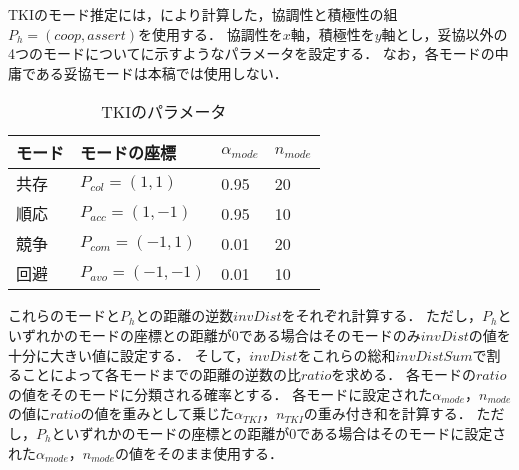 TKIのモード推定には，により計算した，協調性と積極性の組$P_h = (coop, assert)$を使用する．
協調性を$x$軸，積極性を$y$軸とし，妥協以外の4つのモードについてに示すようなパラメータを設定する．
なお，各モードの中庸である妥協モードは本稿では使用しない．

\begin{table}[b]
    \centering
    \caption{TKIのパラメータ}
    \begin{tabular}{llll} \toprule
        モード & モードの座標 & $\alpha_{mode}$ & $n_{mode}$ \\ \midrule
        共存 & $P_{col} = (1, 1)$ & 0.95 & 20 \\
        順応 & $P_{acc} = (1, -1)$ & 0.95 & 10 \\
        競争 & $P_{com} = (-1, 1)$ & 0.01 & 20\\
        回避 & $P_{avo} = (-1, -1)$ & 0.01 & 10 \\ \bottomrule
    \end{tabular}
    \label{tab:tki-param}
\end{table}

これらのモードと$P_h$との距離の逆数$invDist$をそれぞれ計算する．
ただし，$P_h$といずれかのモードの座標との距離が0である場合はそのモードのみ$invDist$の値を十分に大きい値に設定する．
そして，$invDist$をこれらの総和$invDistSum$で割ることによって各モードまでの距離の逆数の比$ratio$を求める．
各モードの$ratio$の値をそのモードに分類される確率とする．
各モードに設定された$\alpha_{mode}$，$n_{mode}$の値に$ratio$の値を重みとして乗じた$\alpha_{TKI}$，$n_{TKI}$の重み付き和を計算する．
ただし，$P_h$といずれかのモードの座標との距離が0である場合はそのモードに設定された$\alpha_{mode}$，$n_{mode}$の値をそのまま使用する．

